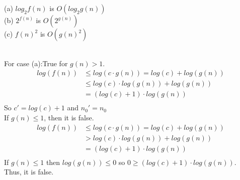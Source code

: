 \documentclass{assignment}
\begin{document}
\begin{problemlist}
\begin{problem}
(a) $log_2 f(n)$ is $O(log_2 g(n))$\\
(b) $2^{f(n)}$ is $O(2^{g(n)})$\\
(c) $f(n)^2$ is $O(g(n)^2)$\\
\end{problem}
\begin{answer}
\\
For case (a):True for $g(n) > 1$.\\
\begin{align*}
log(f(n)) &\le log(c\cdot g(n))= log(c) + log(g(n))\\
& \le log(c)\cdot log(g(n)) + log(g(n))\\
& = (log(c) + 1)\cdot log(g(n))\\
\end{align*}
So $c'=log(c)+1$ and $n_0'=n_0$\\
If $g(n) \le 1$, then it is false.\\
\begin{align*}
log(f(n)) &\le log(c\cdot g(n))= log(c) + log(g(n))\\
& > log(c)\cdot log(g(n)) + log(g(n))\\
& = (log(c) + 1)\cdot log(g(n))\\
\end{align*}
If $g(n) \le 1$ then $log(g(n)) \le 0$ so $0\ge(log(c) + 1)\cdot log(g(n))$.\\
Thus, it is false.\\


\end{answer}
\end{problemlist}
\end{document}
